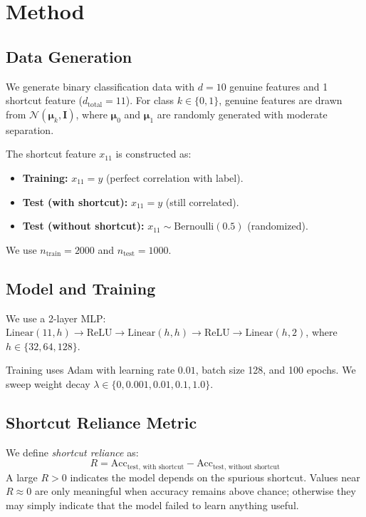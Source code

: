 \documentclass[11pt,a4paper]{article}
\begin{document}
\section{Method}

\subsection{Data Generation}

We generate binary classification data with $d = 10$ genuine features and 1 shortcut feature ($d_{\text{total}} = 11$). For class $k \in \{0, 1\}$, genuine features are drawn from $\mathcal{N}(\boldsymbol{\mu}_k, \mathbf{I})$, where $\boldsymbol{\mu}_0$ and $\boldsymbol{\mu}_1$ are randomly generated with moderate separation.

The shortcut feature $x_{11}$ is constructed as:
\begin{itemize}
  \item \textbf{Training:} $x_{11} = y$ (perfect correlation with label).
  \item \textbf{Test (with shortcut):} $x_{11} = y$ (still correlated).
  \item \textbf{Test (without shortcut):} $x_{11} \sim \text{Bernoulli}(0.5)$ (randomized).
\end{itemize}

We use $n_{\text{train}} = 2000$ and $n_{\text{test}} = 1000$.

\subsection{Model and Training}

We use a 2-layer MLP: $\text{Linear}(11, h) \to \text{ReLU} \to \text{Linear}(h, h) \to \text{ReLU} \to \text{Linear}(h, 2)$, where $h \in \{32, 64, 128\}$.

Training uses Adam with learning rate $0.01$, batch size 128, and 100 epochs. We sweep weight decay $\lambda \in \{0, 0.001, 0.01, 0.1, 1.0\}$.

\subsection{Shortcut Reliance Metric}

We define \emph{shortcut reliance} as:
\[
  R = \text{Acc}_{\text{test, with shortcut}} - \text{Acc}_{\text{test, without shortcut}}
\]
A large $R > 0$ indicates the model depends on the spurious shortcut. Values near $R \approx 0$ are only meaningful when accuracy remains above chance; otherwise they may simply indicate that the model failed to learn anything useful.
\end{document}
